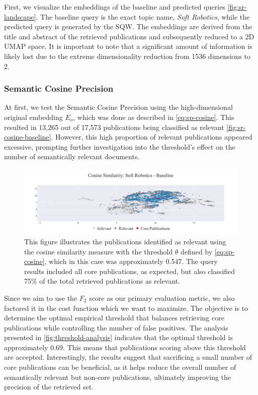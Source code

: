 First, we visualize the embeddings of the baseline and predicted queries \autoref{fig:sr-landscape}. The baseline query is the exact topic name, \textit{Soft Robotics}, while the predicted query is generated by the SQW. The embeddings are derived from the title and abstract of the retrieved publications and subsequently reduced to a 2D UMAP \autocite{mcinnes2020umap} space. It is important to note that a significant amount of information is likely lost due to the extreme dimensionality reduction from 1536 dimensions to 2.

\subsubsection{Semantic Cosine Precision}

At first, we test the Semantic Cosine Precision using the high-dimensional original embedding $E_o$, which was done as described in \autoref{eq:sp-cosine}. This resulted in 13,265 out of 17,573 publications being classified as relevant \autoref{fig:sr-cosine-baseline}. However, this high proportion of relevant publications appeared excessive, prompting further investigation into the threshold's effect on the number of semantically relevant documents.

\begin{figure}[!ht]
	\hspace*{-1cm}	
	\includegraphics[scale=0.45]{pics/sr-cosine-baseline.pdf}
	\caption[Semantic Cosine Similarity: Soft Robotics]{This figure illustrates the publications identified as relevant using the cosine similarity measure with the threshold $\theta$ defined by \autoref{eq:sp-cosine}, which in this case was approximately 0.547. The query results included all core publications, as expected, but also classified 75\% of the total retrieved publications as relevant.}\label{fig:sr-cosine-baseline}
\end{figure}

Since we aim to use the $F_2$ score as our primary evaluation metric, we also factored it in the cost function which we want to maximize. The objective is to determine the optimal empirical threshold that balances retrieving core publications while controlling the number of false positives. The analysis presented in \autoref{fig:threshold-analysis} indicates that the optimal threshold is approximately 0.69. This means that publications scoring above this threshold are accepted. Interestingly, the results suggest that sacrificing a small number of core publications can be beneficial, as it helps reduce the overall number of semantically relevant but non-core publications, ultimately improving the precision of the retrieved set.



